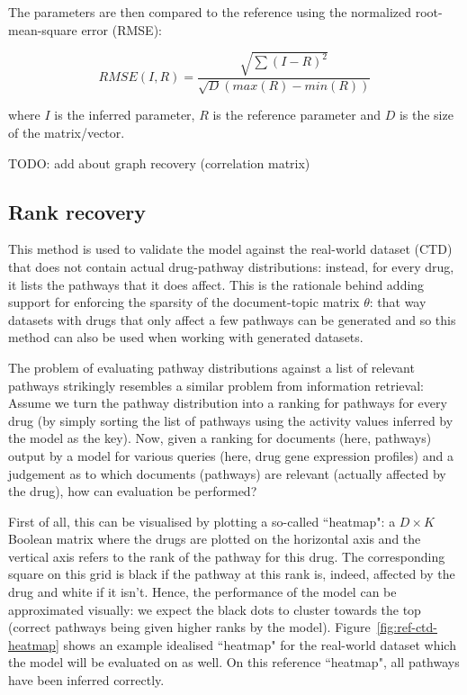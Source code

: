\documentclass[12pt,a4paper,twoside,openright]{report}
\begin{document}
The parameters are then compared to the reference using the normalized root-mean-square error (RMSE):

\begin{equation}
\mathit{RMSE}(I, R) = \frac{\sqrt{\sum{(I-R)^2}}}{\sqrt{D}(max(R) - min(R))}
\end{equation}

where $I$ is the inferred parameter, $R$ is the reference parameter and $D$ is the size of the matrix/vector.

TODO: add about graph recovery (correlation matrix)

\subsection{Rank recovery}

This method is used to validate the model against the real-world dataset (CTD) that does not contain actual drug-pathway distributions: instead, for every drug, it lists the pathways that it does affect. This is the rationale behind adding support for enforcing the sparsity of the document-topic matrix $\theta$: that way datasets with drugs that only affect a few pathways can be generated and so this method can also be used when working with generated datasets.

The problem of evaluating pathway distributions against a list of relevant pathways strikingly resembles a similar problem from information retrieval: Assume we turn the pathway distribution into a ranking for pathways for every drug (by simply sorting the list of pathways using the activity values inferred by the model as the key). Now, given a ranking for documents (here, pathways) output by a model for various queries (here, drug gene expression profiles) and a judgement as to which documents (pathways) are relevant (actually affected by the drug), how can evaluation be performed?

First of all, this can be visualised by plotting a so-called ``heatmap": a $D \times K$ Boolean matrix where the drugs are plotted on the horizontal axis and the vertical axis refers to the rank of the pathway for this drug. The corresponding square on this grid is black if the pathway at this rank is, indeed, affected by the drug and white if it isn't. Hence, the performance of the model can be approximated visually: we expect the black dots to cluster towards the top (correct pathways being given higher ranks by the model). Figure~\ref{fig:ref-ctd-heatmap} shows an example idealised ``heatmap" for the real-world dataset which the model will be evaluated on as well. On this reference ``heatmap", all pathways have been inferred correctly.
\end{document}
